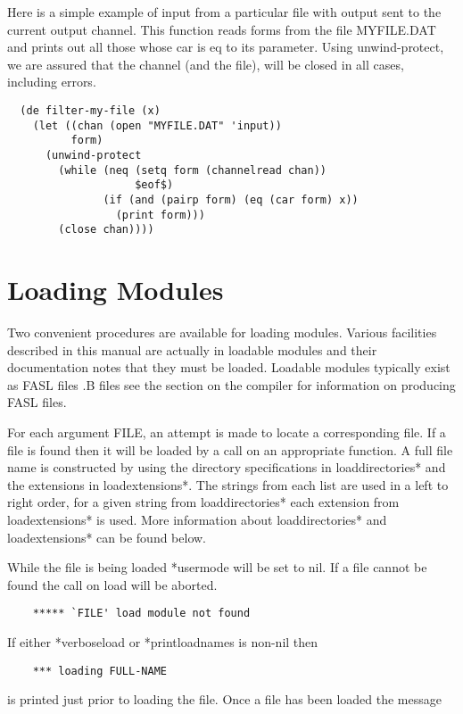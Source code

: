 Here  is a simple example of input from a particular file with
output sent to the current output channel.  This function  reads
forms  from  the  file MYFILE.DAT and prints out all those whose
				car is eq to  its  parameter.    Using  unwind-protect,  we  are
				assured  that  the channel (and the file), will be closed in all
				cases, including errors.

\begin{verbatim}
  (de filter-my-file (x)
    (let ((chan (open "MYFILE.DAT" 'input))
          form)
      (unwind-protect
        (while (neq (setq form (channelread chan))
                    $eof$)
               (if (and (pairp form) (eq (car form) x))
                 (print form)))
        (close chan))))
\end{verbatim}

\section{Loading Modules}

Two convenient procedures are available for loading  modules.
Various facilities described  in this manual are actually in
loadable modules and their documentation notes that they must be
loaded.  Loadable modules typically exist as FASL files .B
files see the section on the compiler for information on
producing FASL files.

{    For each argument FILE, an  attempt  is  made  to  locate  a
    corresponding  file.   If  a  file  is found then it will be
    loaded by a call on an appropriate function.   A  full  file
    name is constructed by using the directory specifications in
    loaddirectories* and the extensions in loadextensions*.  The
    strings  from  each  list are used in a left to right order,
    for a given string from loaddirectories* each extension from
    loadextensions*   is   used.  More   information   about
    loaddirectories* and loadextensions* can be found below.
}

While the file is being loaded *usermode will be set to nil.
If a file cannot be found the call on load will be aborted.

\begin{verbatim}
    ***** `FILE' load module not found
\end{verbatim}
    If either *verboseload or *printloadnames is non-nil then

\begin{verbatim}
    *** loading FULL-NAME
\end{verbatim}
    is  printed just prior to loading the file.  Once a file has
    been loaded the message

